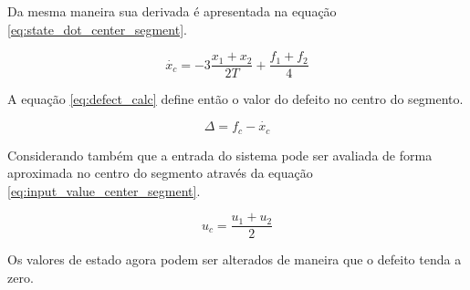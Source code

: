 Da mesma maneira sua derivada é apresentada na equação \ref{eq:state_dot_center_segment}.

\begin{equation}
    \label{eq:state_dot_center_segment}
    \dot{x_{c}} = -3\frac{x_{1} + x_{2}}{2T} + \frac{f_{1} + f_{2}}{4}
\end{equation}

A equação \ref{eq:defect_calc} define então o valor do defeito no centro do segmento.

\begin{equation}
    \label{eq:defect_calc}
    \Delta = f_c - \dot{x_c}
\end{equation}

Considerando também que a entrada do sistema pode ser avaliada de forma aproximada no centro do segmento através da equação \ref{eq:input_value_center_segment}.

\begin{equation}
    \label{eq:input_value_center_segment}
    u_c = \frac{u_1 + u_2}{2}
\end{equation}

Os valores de estado agora podem ser alterados de maneira que o defeito tenda a zero.